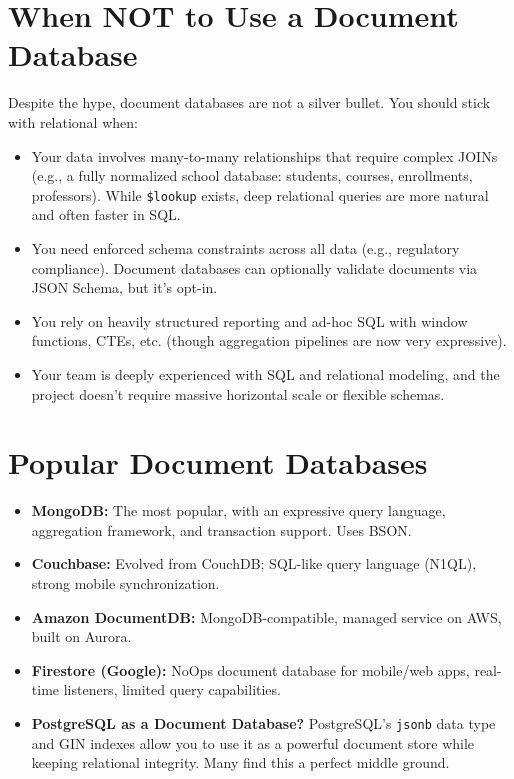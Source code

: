 \documentclass[12pt,a4paper]{article}
\begin{document}
\section{When NOT to Use a Document Database}
Despite the hype, document databases are not a silver bullet. You should stick with relational when:
\begin{itemize}
    \item Your data involves many-to-many relationships that require complex JOINs (e.g., a fully normalized school database: students, courses, enrollments, professors). While \texttt{\$lookup} exists, deep relational queries are more natural and often faster in SQL.
    \item You need enforced schema constraints across all data (e.g., regulatory compliance). Document databases can optionally validate documents via JSON Schema, but it's opt-in.
    \item You rely on heavily structured reporting and ad-hoc SQL with window functions, CTEs, etc. (though aggregation pipelines are now very expressive).
    \item Your team is deeply experienced with SQL and relational modeling, and the project doesn't require massive horizontal scale or flexible schemas.
\end{itemize}

\section{Popular Document Databases}
\begin{itemize}
    \item \textbf{MongoDB:} The most popular, with an expressive query language, aggregation framework, and transaction support. Uses BSON.
    \item \textbf{Couchbase:} Evolved from CouchDB; SQL-like query language (N1QL), strong mobile synchronization.
    \item \textbf{Amazon DocumentDB:} MongoDB-compatible, managed service on AWS, built on Aurora.
    \item \textbf{Firestore (Google):} NoOps document database for mobile/web apps, real-time listeners, limited query capabilities.
    \item \textbf{PostgreSQL as a Document Database?} PostgreSQL's \texttt{jsonb} data type and GIN indexes allow you to use it as a powerful document store while keeping relational integrity. Many find this a perfect middle ground.
\end{itemize}
\end{document}
